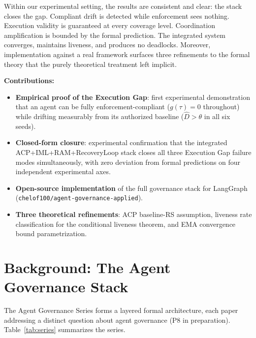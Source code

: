 \documentclass[11pt]{article}
\newcommand{\Dhat}{\widehat{D}}
\begin{document}
Within our experimental setting, the results are consistent and clear: the stack closes the gap.
Compliant drift is detected while enforcement sees nothing.
Execution validity is guaranteed at every coverage level.
Coordination amplification is bounded by the formal prediction.
The integrated system converges, maintains liveness, and produces no deadlocks.
Moreover, implementation against a real framework surfaces three refinements
to the formal theory that the purely theoretical treatment left implicit.

\textbf{Contributions:}
\begin{itemize}[leftmargin=2em, topsep=2pt]
  \item \textbf{Empirical proof of the Execution Gap}: first experimental
        demonstration that an agent can be fully enforcement-compliant
        ($g(\tau)=0$ throughout) while drifting measurably from its
        authorized baseline ($\Dhat > \theta$ in all six seeds).
  \item \textbf{Closed-form closure}: experimental confirmation that the
        integrated ACP+IML+RAM+RecoveryLoop stack closes all three Execution
        Gap failure modes simultaneously, with zero deviation from formal
        predictions on four independent experimental axes.
  \item \textbf{Open-source implementation} of the full governance stack for
        LangGraph (\texttt{chelof100/agent-governance-applied}).
  \item \textbf{Three theoretical refinements}: ACP baseline-RS assumption,
        liveness rate classification for the conditional liveness theorem,
        and EMA convergence bound parametrization.
\end{itemize}

\section{Background: The Agent Governance Stack}
\label{sec:background}

The Agent Governance Series forms a layered formal architecture, each paper
addressing a distinct question about agent governance (P8 in preparation).
Table~\ref{tab:series} summarizes the series.
\end{document}
